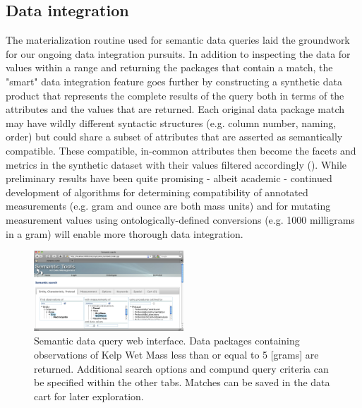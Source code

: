 \subsection{Data integration}
The materialization routine used for semantic data queries laid the groundwork for our ongoing data integration pursuits.
In addition to inspecting the data for values within a range and returning the packages that contain a match, the "smart" data integration feature goes further by constructing a synthetic data product that represents the complete results of the query both in terms of the attributes and the values that are returned. Each original data package match may have wildly different syntactic structures (e.g. column number, naming, order) but could share a subset of attributes that are asserted as semantically compatible. These compatible, in-common attributes then become the facets and metrics in the synthetic dataset with their values filtered accordingly (). While preliminary results have been quite promising - albeit academic - continued development of algorithms for determining compatibility of annotated measurements (e.g. gram and ounce are both mass units) and for mutating measurement values using ontologically-defined conversions (e.g. 1000 milligrams in a gram) will enable more thorough data integration.

\begin{figure}
\centering
\includegraphics[width=0.5\textwidth]{images/metacat-query.png}
\caption{Semantic data query web interface. Data packages containing observations of Kelp Wet Mass less than or equal to 5 [grams] are returned. Additional search options and compund query criteria can be specified within the other tabs. Matches can be saved in the data cart for later exploration.}
\label{fig:metacat-query}
\end{figure}

